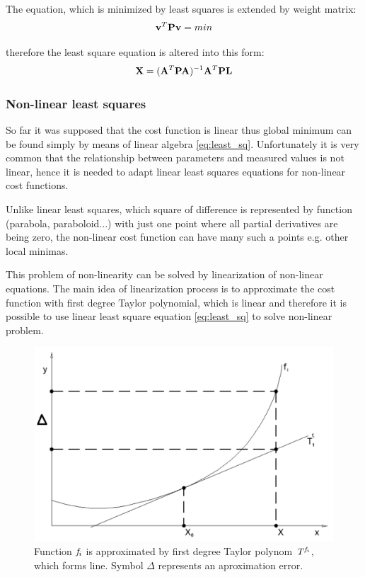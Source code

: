 \documentclass[a4paper,12pt]{article}
\newcommand{\ematr}[1]{
{\bf #1}
}
\newcommand{\evect}[1]{
{\bf #1}
}
\newcommand{\efunc}[1]{
{\it #1}
}
\begin{document}
The equation, which is minimized by least squares is extended by weight matrix:
\begin{equation}
\evect{v}^{T}  \ematr{P} \evect{v} = min
\end{equation}

therefore the least square equation is altered into this form:
\begin{equation}
\label{eq:least_sq}
\evect{X} = (\ematr{A}^{T} \ematr{P} \ematr{A})^{-1} \ematr{A}^{T} \ematr{P} \ematr{L}
\end{equation}

\subsubsection{Non-linear least squares}
\label{sec:non_least}
So far it was supposed that the cost function is linear thus global minimum can be found simply by means of linear algebra  \eqref{eq:least_sq}.
Unfortunately it is very common that the relationship between parameters and 
measured values is not linear, hence it is needed to adapt linear least squares equations for non-linear
cost functions.

Unlike linear least squares, which square of difference \label{eq:least_be_part}
is represented by function  (parabola, paraboloid...) with just one point where all
partial derivatives are being zero, the non-linear cost function can have many such a points e.g. other local minimas. 

This problem of non-linearity can be solved by linearization of non-linear equations.
The main idea of linearization process is to approximate the cost function with first degree Taylor polynomial,
which is linear and therefore it is possible to use linear least square equation \eqref{eq:least_sq} 
to solve non-linear problem. 

\begin{figure}[h]
    \centering
    \includegraphics[scale=0.2]{figures/taylor.png}
    \caption{Function $\efunc{f}_{i}$ is approximated by first degree Taylor polynom $\efunc{T} ^{\efunc{f}_{i}}$,
    which forms line. Symbol $\Delta$ represents an aproximation error.}
    \label{fig:taylor}
\end{figure}
\end{document}
